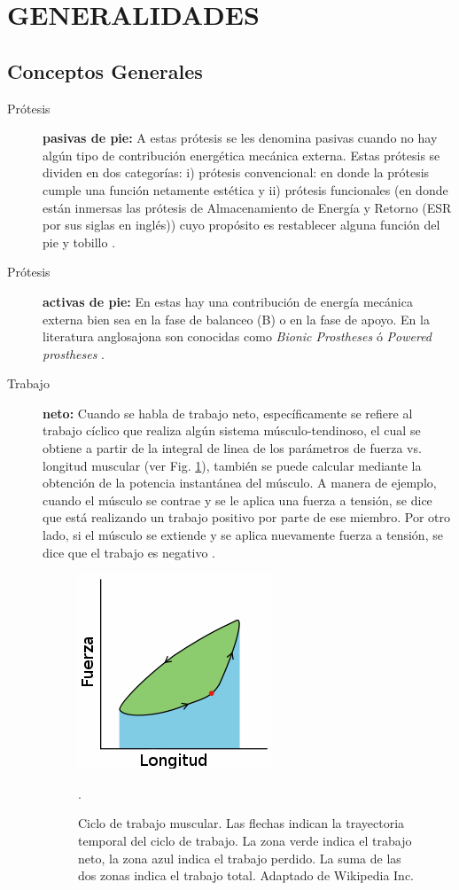 \documentclass[12pt,english]{article}
\providecommand{\printnomenclature}{\printglossary}
\begin{document}
\section{GENERALIDADES}

\printnomenclature{}


\subsection*{Conceptos Generales}
\begin{description}
\item [{Prótesis}] \textbf{pasivas de pie:} A estas prótesis se les denomina
pasivas cuando no hay algún tipo de contribución energética mecánica
externa. Estas prótesis se dividen en dos categorías: i) prótesis
convencional: en donde la prótesis cumple una función netamente estética
y ii) prótesis funcionales (en donde están inmersas las prótesis de
Almacenamiento de Energía y Retorno (ESR por sus siglas en inglés))
cuyo propósito es restablecer alguna función del pie y tobillo \cite{Versluys2009}.
\item [{Prótesis}] \textbf{activas de pie: }En estas hay una contribución
de energía mecánica externa bien sea en la fase de balanceo (B) o
en la fase de apoyo. En la literatura anglosajona son conocidas como
\emph{Bionic Prostheses} ó \emph{Powered prostheses} \cite{Cherelle2014a}.
\item [{Trabajo}] \textbf{neto: }Cuando se habla de trabajo neto, específicamente
se refiere al trabajo cíclico que realiza algún sistema músculo-tendinoso,
el cual se obtiene a partir de la integral de linea de los parámetros
de fuerza vs. longitud muscular (ver Fig. \ref{fig:Ciclo-de-trabajo}),
también se puede calcular mediante la obtención de la potencia instantánea
del músculo. A manera de ejemplo, cuando el músculo se contrae y se
le aplica una fuerza a tensión, se dice que está realizando un trabajo
positivo por parte de ese miembro. Por otro lado, si el músculo se
extiende y se aplica nuevamente fuerza a tensión, se dice que el trabajo
es negativo \cite{Altringham1990}. 


\begin{figure}
\centering{}\includegraphics[scale=0.5]{workloop}\caption{\label{fig:Ciclo-de-trabajo}Ciclo de trabajo muscular. Las flechas
indican la trayectoria temporal del ciclo de trabajo. La zona verde
indica el trabajo neto, la zona azul indica el trabajo perdido. La
suma de las dos zonas indica el trabajo total. Adaptado de Wikipedia Inc. \cite{workloop}}.
\end{figure}



\end{description}
\end{document}
